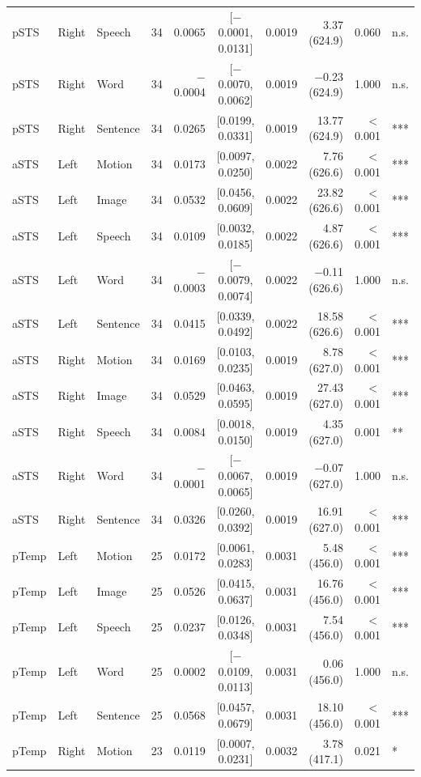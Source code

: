 \begin{table}[h]
\begin{tabular}{lllrrcrrrl}
pSTS & Right & Speech & 34 & 0.0065 & [$-$0.0001, 0.0131] & 0.0019 & 3.37 (624.9) & 0.060 & n.s. \\
pSTS & Right & Word & 34 & $-$0.0004 & [$-$0.0070, 0.0062] & 0.0019 & $-$0.23 (624.9) & 1.000 & n.s. \\
pSTS & Right & Sentence & 34 & 0.0265 & [0.0199, 0.0331] & 0.0019 & 13.77 (624.9) & $<$0.001 & *** \\
aSTS & Left & Motion & 34 & 0.0173 & [0.0097, 0.0250] & 0.0022 & 7.76 (626.6) & $<$0.001 & *** \\
aSTS & Left & Image & 34 & 0.0532 & [0.0456, 0.0609] & 0.0022 & 23.82 (626.6) & $<$0.001 & *** \\
aSTS & Left & Speech & 34 & 0.0109 & [0.0032, 0.0185] & 0.0022 & 4.87 (626.6) & $<$0.001 & *** \\
aSTS & Left & Word & 34 & $-$0.0003 & [$-$0.0079, 0.0074] & 0.0022 & $-$0.11 (626.6) & 1.000 & n.s. \\
aSTS & Left & Sentence & 34 & 0.0415 & [0.0339, 0.0492] & 0.0022 & 18.58 (626.6) & $<$0.001 & *** \\
aSTS & Right & Motion & 34 & 0.0169 & [0.0103, 0.0235] & 0.0019 & 8.78 (627.0) & $<$0.001 & *** \\
aSTS & Right & Image & 34 & 0.0529 & [0.0463, 0.0595] & 0.0019 & 27.43 (627.0) & $<$0.001 & *** \\
aSTS & Right & Speech & 34 & 0.0084 & [0.0018, 0.0150] & 0.0019 & 4.35 (627.0) & 0.001 & ** \\
aSTS & Right & Word & 34 & $-$0.0001 & [$-$0.0067, 0.0065] & 0.0019 & $-$0.07 (627.0) & 1.000 & n.s. \\
aSTS & Right & Sentence & 34 & 0.0326 & [0.0260, 0.0392] & 0.0019 & 16.91 (627.0) & $<$0.001 & *** \\
pTemp & Left & Motion & 25 & 0.0172 & [0.0061, 0.0283] & 0.0031 & 5.48 (456.0) & $<$0.001 & *** \\
pTemp & Left & Image & 25 & 0.0526 & [0.0415, 0.0637] & 0.0031 & 16.76 (456.0) & $<$0.001 & *** \\
pTemp & Left & Speech & 25 & 0.0237 & [0.0126, 0.0348] & 0.0031 & 7.54 (456.0) & $<$0.001 & *** \\
pTemp & Left & Word & 25 & 0.0002 & [$-$0.0109, 0.0113] & 0.0031 & 0.06 (456.0) & 1.000 & n.s. \\
pTemp & Left & Sentence & 25 & 0.0568 & [0.0457, 0.0679] & 0.0031 & 18.10 (456.0) & $<$0.001 & *** \\
pTemp & Right & Motion & 23 & 0.0119 & [0.0007, 0.0231] & 0.0032 & 3.78 (417.1) & 0.021 & * \\

\end{tabular}
\end{table}
